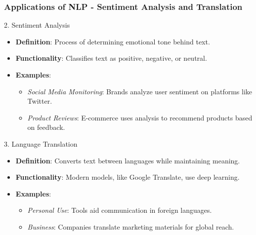 \documentclass[aspectratio=169]{beamer}
\begin{document}
\begin{frame}[fragile]
    \frametitle{Applications of NLP - Sentiment Analysis and Translation}
    \begin{block}{2. Sentiment Analysis}
        \begin{itemize}
            \item \textbf{Definition}: Process of determining emotional tone behind text.
            \item \textbf{Functionality}: Classifies text as positive, negative, or neutral.
            \item \textbf{Examples}:
            \begin{itemize}
                \item \textit{Social Media Monitoring}: Brands analyze user sentiment on platforms like Twitter.
                \item \textit{Product Reviews}: E-commerce uses analysis to recommend products based on feedback.
            \end{itemize}
        \end{itemize}
    \end{block}
    
    \begin{block}{3. Language Translation}
        \begin{itemize}
            \item \textbf{Definition}: Converts text between languages while maintaining meaning.
            \item \textbf{Functionality}: Modern models, like Google Translate, use deep learning.
            \item \textbf{Examples}:
            \begin{itemize}
                \item \textit{Personal Use}: Tools aid communication in foreign languages.
                \item \textit{Business}: Companies translate marketing materials for global reach.
            \end{itemize}
        \end{itemize}
    \end{block}
\end{frame}
\end{document}
